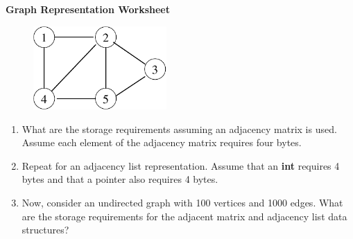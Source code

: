 \documentclass[12pt]{article}
\newcommand{\lsp}[1]{\large\renewcommand{\baselinestretch}{#1}\normalsize}
\begin{document}
\lsp{1}
\pagestyle{plain}
\begin{center}
{\bf
Graph Representation Worksheet
}
\end{center}

\begin{figure}[h]
\center
\includegraphics[width = 2in]{adjacency.pdf}
\end{figure}

\begin{enumerate}
\item What are the storage requirements assuming an adjacency matrix
is used. Assume each element of the adjacency matrix requires four 
bytes.

\vspace*{1in}

\item Repeat for an adjacency list representation. Assume that an 
{\bf int} requires 4 bytes and that a pointer also requires 4 bytes.

\vspace*{1in}

\item Now, consider an undirected graph with 100 vertices and 1000 edges. 
What are the storage requirements for the adjacent matrix and adjacency
list data structures?
 
\end{enumerate}
 
\end{document}
